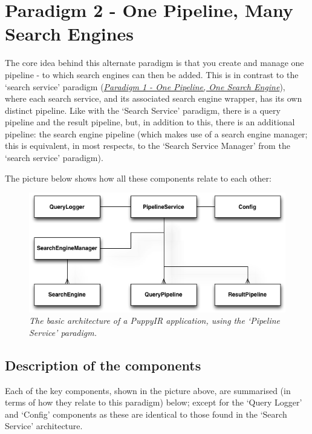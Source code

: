 \documentclass[letterpaper,10pt,english]{sphinxmanual}
\begin{document}
\section{Paradigm 2 - One Pipeline, Many Search Engines}
\label{pipeline:paradigm-2-one-pipeline-many-search-engines}\label{pipeline::doc}\label{pipeline:pipeline-architecture}
The core idea behind this alternate paradigm is that you create and manage one pipeline - to which search engines can then be added. This is in contrast to the ‘search service’ paradigm ({\hyperref[service:service-architecture]{\emph{Paradigm 1 - One Pipeline, One Search Engine}}}), where each search service, and its associated search engine wrapper, has its own distinct pipeline. Like with the ‘Search Service’ paradigm, there is a query pipeline and the result pipeline, but, in addition to this, there is an additional pipeline: the search engine pipeline (which makes use of a search engine manager; this is equivalent, in most respects, to the ‘Search Service Manager’ from the ‘search service’ paradigm).

The picture below shows how all these components relate to each other:
\begin{figure}[htbp]
\centering
\capstart

\includegraphics{puppy-pipeline-architecture.png}
\caption{\emph{The basic architecture of a PuppyIR application, using the `Pipeline Service' paradigm.}}\end{figure}


\subsection{Description of the components}
\label{pipeline:description-of-the-components}
Each of the key components, shown in the picture above, are summarised (in terms of how they relate to this paradigm) below; except for the ‘Query Logger’ and ‘Config’ components as these are identical to those found in the ‘Search Service’ architecture.
\end{document}
